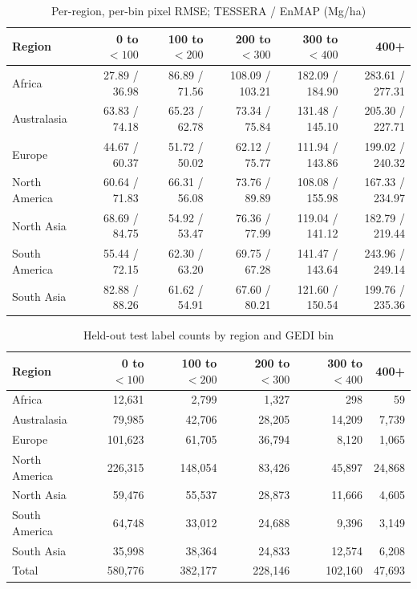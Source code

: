 \documentclass[11pt]{article}
\begin{document}
\begin{table}[H]
	\centering
	\caption{Per-region, per-bin pixel RMSE; TESSERA / EnMAP (Mg/ha)}
	\scriptsize
	\begin{tabular}{@{}lrrrrr@{}}
		\toprule
		Region        & 0 to $<100$   & 100 to $<200$ & 200 to $<300$   & 300 to $<400$   & 400+            \\
		\midrule
		Africa        & 27.89 / 36.98 & 86.89 / 71.56 & 108.09 / 103.21 & 182.09 / 184.90 & 283.61 / 277.31 \\
		Australasia   & 63.83 / 74.18 & 65.23 / 62.78 & 73.34 / 75.84   & 131.48 / 145.10 & 205.30 / 227.71 \\
		Europe        & 44.67 / 60.37 & 51.72 / 50.02 & 62.12 / 75.77   & 111.94 / 143.86 & 199.02 / 240.32 \\
		North America & 60.64 / 71.83 & 66.31 / 56.08 & 73.76 / 89.89   & 108.08 / 155.98 & 167.33 / 234.97 \\
		North Asia    & 68.69 / 84.75 & 54.92 / 53.47 & 76.36 / 77.99   & 119.04 / 141.12 & 182.79 / 219.44 \\
		South America & 55.44 / 72.15 & 62.30 / 63.20 & 69.75 / 67.28   & 141.47 / 143.64 & 243.96 / 249.14 \\
		South Asia    & 82.88 / 88.26 & 61.62 / 54.91 & 67.60 / 80.21   & 121.60 / 150.54 & 199.76 / 235.36 \\
		\bottomrule
	\end{tabular}
\end{table}

\begin{table}[H]
	\centering
	\caption{Held-out test label counts by region and GEDI bin}
	\small
	\begin{tabular}{@{}lrrrrr@{}}
		\toprule
		Region        & 0 to $<100$ & 100 to $<200$ & 200 to $<300$ & 300 to $<400$ & 400+   \\
		\midrule
		Africa        & 12,631      & 2,799         & 1,327         & 298           & 59     \\
		Australasia   & 79,985      & 42,706        & 28,205        & 14,209        & 7,739  \\
		Europe        & 101,623     & 61,705        & 36,794        & 8,120         & 1,065  \\
		North America & 226,315     & 148,054       & 83,426        & 45,897        & 24,868 \\
		North Asia    & 59,476      & 55,537        & 28,873        & 11,666        & 4,605  \\
		South America & 64,748      & 33,012        & 24,688        & 9,396         & 3,149  \\
		South Asia    & 35,998      & 38,364        & 24,833        & 12,574        & 6,208  \\
		\midrule
		Total         & 580,776     & 382,177       & 228,146       & 102,160       & 47,693 \\
		\bottomrule
	\end{tabular}
\end{table}
\end{document}

